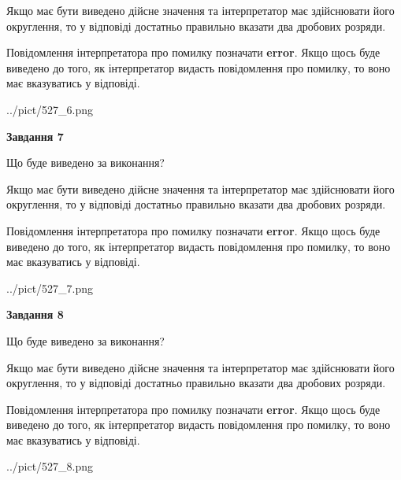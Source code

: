\documentclass[12pt, ukrainian]{article}
\begin{document}
{\begin {Large}
Якщо має бути виведено дійсне значення та інтерпретатор має здійснювати його округлення, 
то у відповіді достатньо правильно вказати два дробових розряди.

Повідомлення інтерпретатора про помилку позначати \textbf{error}.
Якщо щось буде виведено до того, як інтерпретатор видасть повідомлення про помилку, 
то воно має вказуватись у відповіді. \par

\begin{center}
	{../pict/527_6.png}
\end{center}
\newpage

{\begin {center}\textbf{Завдання 7}\end {center}}\par
Що буде виведено за виконання? \par

Якщо має бути виведено дійсне значення та інтерпретатор має здійснювати його округлення, 
то у відповіді достатньо правильно вказати два дробових розряди.

Повідомлення інтерпретатора про помилку позначати \textbf{error}.
Якщо щось буде виведено до того, як інтерпретатор видасть повідомлення про помилку, 
то воно має вказуватись у відповіді. \par

\begin{center}
	{../pict/527_7.png}
\end{center}
\newpage

{\begin {center}\textbf{Завдання 8}\end {center}}\par
Що буде виведено за виконання? \par

Якщо має бути виведено дійсне значення та інтерпретатор має здійснювати його округлення, 
то у відповіді достатньо правильно вказати два дробових розряди.

Повідомлення інтерпретатора про помилку позначати \textbf{error}.
Якщо щось буде виведено до того, як інтерпретатор видасть повідомлення про помилку, 
то воно має вказуватись у відповіді. \par

\begin{center}
	{../pict/527_8.png}
\end{center}
\newpage


\end{Large}}
\end{document}
